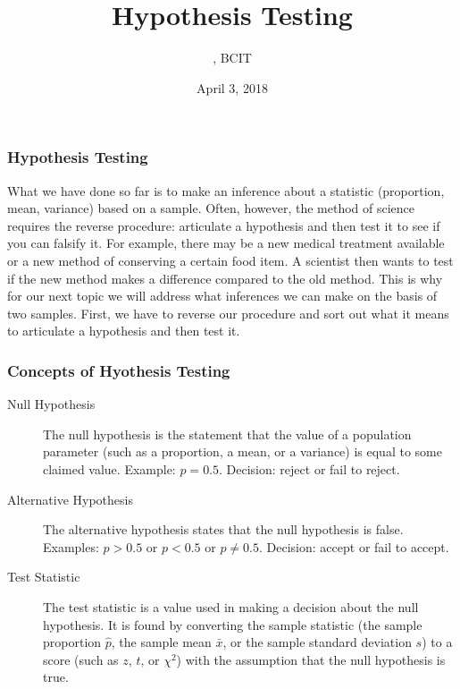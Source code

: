 \documentclass[xcolor=dvipsnames]{beamer}
\title{Hypothesis Testing}
\subtitle{{\CourseNumber}, BCIT}
\author{\CourseName}
\date{April 3, 2018}
\begin{document}
\begin{frame}
  \titlepage
\end{frame}

\begin{frame}
  \frametitle{Hypothesis Testing}
  What we have done so far is to make an inference about a statistic
  (proportion, mean, variance) based on a sample. Often, however,
  the method of science requires the reverse procedure: articulate a
  hypothesis and then test it to see if you can falsify it. For
  example, there may be a new medical treatment available or a new
  method of conserving a certain food item. A scientist then wants to
  test if the new method makes a difference compared to the old
  method. This is why for our next topic we will address what
  inferences we can make on the basis of two samples. First, we have
  to reverse our procedure and sort out what it means to articulate a
  hypothesis and then test it.
\end{frame}

\begin{frame}
  \frametitle{Concepts of Hyothesis Testing}
  \begin{description}
  \item[Null Hypothesis] The null hypothesis is the statement that the
    value of a population parameter (such as a proportion, a mean, or
    a variance) is equal to some claimed value. Example: $p=0.5$.
    Decision: \alert{reject} or \alert{fail to reject}.
  \item[Alternative Hypothesis] The alternative hypothesis states that
    the null hypothesis is false. Examples: $p>0.5$ or $p<0.5$ or
    $p\neq{}0.5$. Decision: \alert{accept} or
    \alert{fail to accept}.
  \item[Test Statistic] The test statistic is a value used in making a
    decision about the null hypothesis. It is found by converting the
    sample statistic (the sample proportion $\hat{p}$, the sample mean
    $\bar{x}$, or the sample standard deviation $s$) to a score (such as
    $z$, $t$, or $\chi^{2}$) with the assumption that the null
    hypothesis is true.
  \end{description}
\end{frame}
\end{document}
